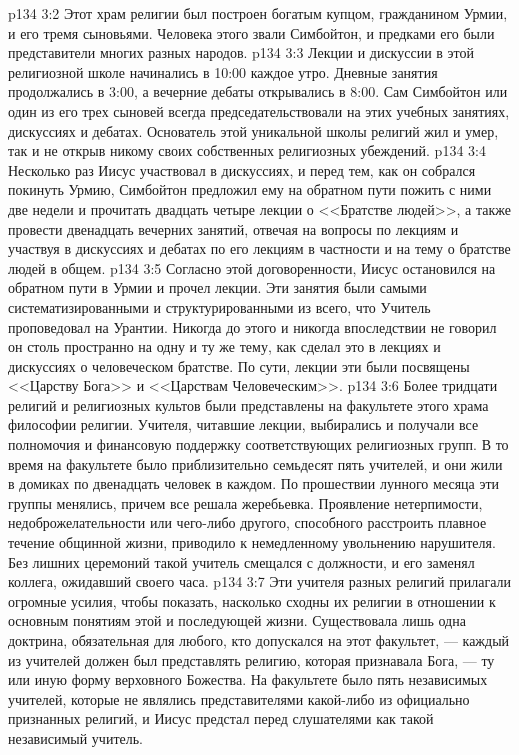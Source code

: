 \vs p134 3:2 Этот храм религии был построен богатым купцом, гражданином Урмии, и его тремя сыновьями. Человека этого звали Симбойтон, и предками его были представители многих разных народов.
\vs p134 3:3 Лекции и дискуссии в этой религиозной школе начинались в 10:00 каждое утро. Дневные занятия продолжались в 3:00, а вечерние дебаты открывались в 8:00. Сам Симбойтон или один из его трех сыновей всегда председательствовали на этих учебных занятиях, дискуссиях и дебатах. Основатель этой уникальной школы религий жил и умер, так и не открыв никому своих собственных религиозных убеждений.
\vs p134 3:4 Несколько раз Иисус участвовал в дискуссиях, и перед тем, как он собрался покинуть Урмию, Симбойтон предложил ему на обратном пути пожить с ними две недели и прочитать двадцать четыре лекции о <<Братстве людей>>, а также провести двенадцать вечерних занятий, отвечая на вопросы по лекциям и участвуя в дискуссиях и дебатах по его лекциям в частности и на тему о братстве людей в общем.
\vs p134 3:5 Согласно этой договоренности, Иисус остановился на обратном пути в Урмии и прочел лекции. Эти занятия были самыми систематизированными и структурированными из всего, что Учитель проповедовал на Урантии. Никогда до этого и никогда впоследствии не говорил он столь пространно на одну и ту же тему, как сделал это в лекциях и дискуссиях о человеческом братстве. По сути, лекции эти были посвящены <<Царству Бога>> и <<Царствам Человеческим>>.
\vs p134 3:6 Более тридцати религий и религиозных культов были представлены на факультете этого храма философии религии. Учителя, читавшие лекции, выбирались и получали все полномочия и финансовую поддержку соответствующих религиозных групп. В то время на факультете было приблизительно семьдесят пять учителей, и они жили в домиках по двенадцать человек в каждом. По прошествии лунного месяца эти группы менялись, причем все решала жеребьевка. Проявление нетерпимости, недоброжелательности или чего\hyp{}либо другого, способного расстроить плавное течение общинной жизни, приводило к немедленному увольнению нарушителя. Без лишних церемоний такой учитель смещался с должности, и его заменял коллега, ожидавший своего часа.
\vs p134 3:7 Эти учителя разных религий прилагали огромные усилия, чтобы показать, насколько сходны их религии в отношении к основным понятиям этой и последующей жизни. Существовала лишь одна доктрина, обязательная для любого, кто допускался на этот факультет, --- каждый из учителей должен был представлять религию, которая признавала Бога, --- ту или иную форму верховного Божества. На факультете было пять независимых учителей, которые не являлись представителями какой\hyp{}либо из официально признанных религий, и Иисус предстал перед слушателями как такой независимый учитель.
